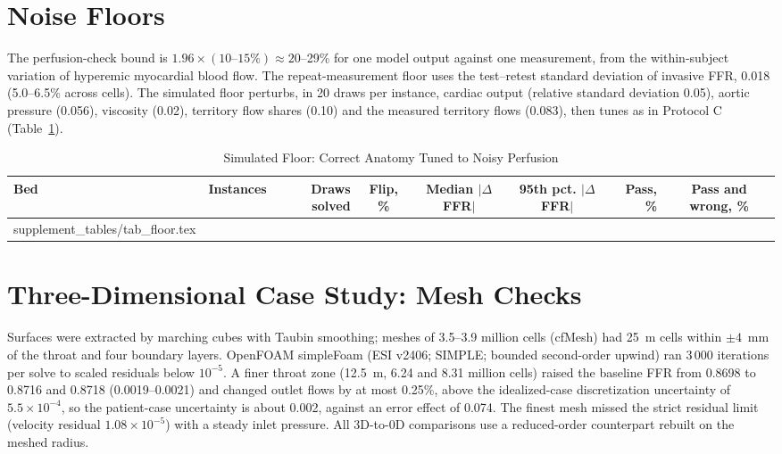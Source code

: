 \documentclass[journal,twoside,web,onecolumn]{ieeecolor}
\begin{document}
\FloatBarrier
{}
\section{Noise Floors}\label{sec:floor}
The perfusion-check bound is $1.96 \times (10\text{--}15\%) \approx 20$--29\% for one model output against one
measurement, from the within-subject variation of hyperemic myocardial blood flow. The repeat-measurement floor uses
the test--retest standard deviation of invasive FFR, 0.018 (5.0--6.5\% across cells). The simulated floor perturbs,
in 20 draws per instance, cardiac output (relative standard deviation 0.05), aortic pressure (0.056), viscosity (0.02),
territory flow shares (0.10) and the measured territory flows (0.083), then tunes as in Protocol C
(Table~\ref{tab:floor}).
\begin{table}[!ht]
\caption{Simulated Floor: Correct Anatomy Tuned to Noisy Perfusion}\label{tab:floor}
\centering\footnotesize
\begin{tabular}{@{}lrrcccrc@{}}
\toprule
Bed & Instances & Draws solved & Flip, \% & Median $|\Delta$FFR$|$ & 95th pct. $|\Delta$FFR$|$ & Pass, \% &
Pass and wrong, \%\\
\midrule
{} supplement_tables/tab_floor.tex 
\bottomrule
\end{tabular}
\end{table}

\FloatBarrier
{}
\section{Three-Dimensional Case Study: Mesh Checks}\label{sec:cfd}
Surfaces were extracted by marching cubes with Taubin smoothing; meshes of 3.5--3.9 million cells (cfMesh) had
25~\textmu m cells within $\pm 4$~mm of the throat and four boundary layers. OpenFOAM simpleFoam (ESI v2406; SIMPLE;
bounded second-order upwind) ran 3\,000 iterations per solve to scaled residuals below $10^{-5}$. A finer throat zone (12.5~\textmu m, 6.24 and 8.31 million cells) raised the baseline FFR from 0.8698 to 0.8716 and 0.8718
(0.0019--0.0021) and changed outlet flows by at most 0.25\%, above the idealized-case discretization uncertainty of $5.5\times10^{-4}$,
so the patient-case uncertainty is about 0.002, against an error effect of 0.074. The finest mesh missed the strict residual limit (velocity residual $1.08\times10^{-5}$) with a steady inlet pressure. All 3D-to-0D
comparisons use a reduced-order counterpart rebuilt on the meshed radius.
\end{document}
